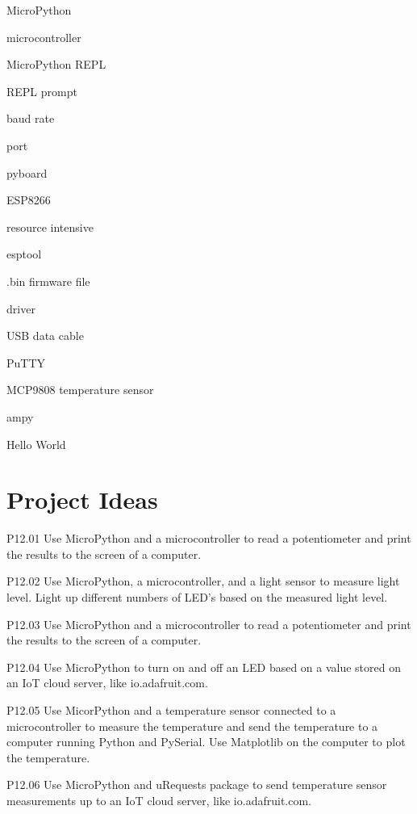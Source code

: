 \documentclass{book}
\newenvironment{problems}{}{}  %
\newenvironment{key_terms}{\begin{multicols}{3}}{\end{multicols}} %
\begin{document}
    
        \begin{key_terms}
        MicroPython

microcontroller

MicroPython REPL

REPL prompt

baud rate

port

pyboard

ESP8266

resource intensive

esptool

.bin firmware file

driver

USB data cable

PuTTY

MCP9808 temperature sensor

ampy

Hello World
        \end{key_terms}

    




    
        \section{Project Ideas}\label{project-ideas}
    




    
        \begin{problems}
        P12.01 Use MicroPython and a microcontroller to read a potentiometer and
print the results to the screen of a computer.

P12.02 Use MicroPython, a microcontroller, and a light sensor to measure
light level. Light up different numbers of LED's based on the measured
light level.

P12.03 Use MicroPython and a microcontroller to read a potentiometer and
print the results to the screen of a computer.

P12.04 Use MicroPython to turn on and off an LED based on a value stored
on an IoT cloud server, like io.adafruit.com.

P12.05 Use MicorPython and a temperature sensor connected to a
microcontroller to measure the temperature and send the temperature to a
computer running Python and PySerial. Use Matplotlib on the computer to
plot the temperature.

P12.06 Use MicroPython and uRequests package to send temperature sensor
measurements up to an IoT cloud server, like io.adafruit.com.
        \end{problems}
\end{document}
